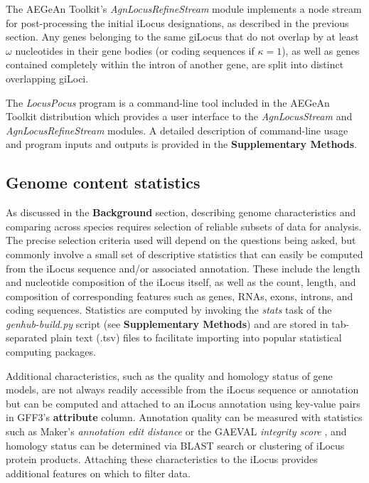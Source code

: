 The AEGeAn Toolkit's \textit{AgnLocusRefineStream} module implements a node stream for post-processing the initial iLocus designations, as described in the previous section.
Any genes belonging to the same giLocus that do not overlap by at least $\omega$ nucleotides in their gene bodies (or coding sequences if $\kappa = 1$), as well as genes contained completely within the intron of another gene, are split into distinct overlapping giLoci.

The \textit{LocusPocus} program is a command-line tool included in the AEGeAn Toolkit distribution which provides a user interface to the \textit{AgnLocusStream} and \textit{AgnLocusRefineStream} modules.
A detailed description of command-line usage and program inputs and outputs is provided in the \textbf{Supplementary Methods}.

\subsection{Genome content statistics}
As discussed in the \textbf{Background} section, describing genome characteristics and comparing across species requires selection of reliable subsets of data for analysis.
The precise selection criteria used will depend on the questions being asked, but commonly involve a small set of descriptive statistics that can easily be computed from the iLocus sequence and/or associated annotation.
These include the length and nucleotide composition of the iLocus itself, as well as the count, length, and composition of corresponding features such as genes, RNAs, exons, introns, and coding sequences.
Statistics are computed by invoking the \textit{stats} task of the \textit{genhub-build.py} script (see \textbf{Supplementary Methods}) and are stored in tab-separated plain text (.tsv) files to facilitate importing into popular statistical computing packages.

Additional characteristics, such as the quality and homology status of gene models, are not always readily accessible from the iLocus sequence or annotation but can be computed and attached to an iLocus annotation using key-value pairs in GFF3's \textbf{attribute} column.
Annotation quality can be measured with statistics such as Maker's \textit{annotation edit distance} \cite{AED} or the GAEVAL \textit{integrity score} \cite{GAEVAL}, and  homology status can be determined via BLAST search or clustering of iLocus protein products.
Attaching these characteristics to the iLocus provides additional features on which to filter data.

